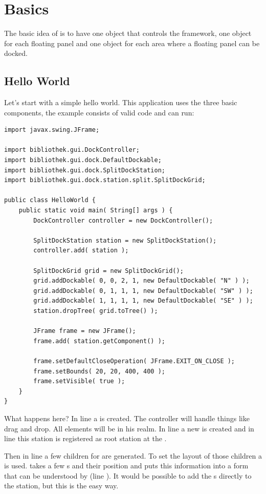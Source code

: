 \section{Basics}
The basic idea of  is to have one object that controls the framework, one object for each floating panel and one object for each area where a floating panel can be docked.


\subsection{Hello World}
Let's start with a simple hello world. This application uses the three basic components, the example consists of valid code and can run:
\begin{lstlisting}
import javax.swing.JFrame;

import bibliothek.gui.DockController;
import bibliothek.gui.dock.DefaultDockable;
import bibliothek.gui.dock.SplitDockStation;
import bibliothek.gui.dock.station.split.SplitDockGrid;

public class HelloWorld {
	public static void main( String[] args ) {
		DockController controller = new DockController();

		SplitDockStation station = new SplitDockStation();
		controller.add( station );
	
		SplitDockGrid grid = new SplitDockGrid();
		grid.addDockable( 0, 0, 2, 1, new DefaultDockable( "N" ) );
		grid.addDockable( 0, 1, 1, 1, new DefaultDockable( "SW" ) );
		grid.addDockable( 1, 1, 1, 1, new DefaultDockable( "SE" ) );
		station.dropTree( grid.toTree() );
	
		JFrame frame = new JFrame();
		frame.add( station.getComponent() );
	
		frame.setDefaultCloseOperation( JFrame.EXIT_ON_CLOSE );
		frame.setBounds( 20, 20, 400, 400 );
		frame.setVisible( true );
	}
}
\end{lstlisting}
What happens here? In line  a  is created. The controller will handle things like drag and drop. All elements will be in his realm. In line  a new  is created and in line  this station is registered as root station at the .

Then in line  a few children for  are generated. To set the layout of those children a  is used.  takes a few s and their position and puts this information into a form that can be understood by  (line ). It would be possible to add the s directly to the station, but this is the easy way.

